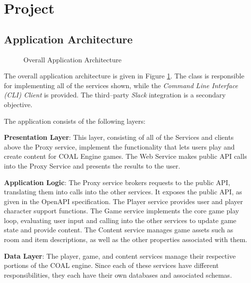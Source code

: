\documentclass{article}
\newcommand{\enterProblemHeader}[1]{
}
\newcommand{\exitProblemHeader}[1]{
\nobreak\extramarks{#1}{}\nobreak
}
\newcounter{homeworkProblemCounter} %
\newcommand{\homeworkProblemName}{}
\newenvironment{homeworkProblem}[1][Problem \arabic{homeworkProblemCounter}]{ %
\stepcounter{homeworkProblemCounter} %
\renewcommand{\homeworkProblemName}{#1} %
\section{\homeworkProblemName} %
\enterProblemHeader{\homeworkProblemName} %
}{
\exitProblemHeader{\homeworkProblemName} %
}
\newcommand{\homeworkSectionName}{}
\newenvironment{homeworkSection}[1]{ %
\renewcommand{\homeworkSectionName}{#1} %
\subsection{\homeworkSectionName} %
\enterProblemHeader{\homeworkProblemName\ [\homeworkSectionName]} %
}{
\enterProblemHeader{\homeworkProblemName} %
}
\begin{document}
\begin{homeworkProblem}[Project]
\begin{homeworkSection}{Application Architecture}
\begin{figure}
\caption{Overall Application Architecture}
\label{fig:arch}
\end{figure}

The overall application architecture is given in Figure \ref{fig:arch}. The class is responsible for implementing all of the services shown, while the \textit{Command Line Interface (CLI) Client} is provided. The third--party \textit{Slack} integration is a secondary objective.

The application consists of the following layers:

\begin{compactitem}
	\item \textbf{Presentation Layer}: This layer, consisting of all of the Services and clients above the Proxy service, implement the functionality that lets users play and create content for COAL Engine games. The Web Service makes public API calls into the Proxy Service and presents the results to the user.
	\item \textbf{Application Logic}: The Proxy service brokers requests to the public API, translating them into calls into the other services. It exposes the public API, as given in the OpenAPI specification. The Player service provides user and player character support functions. The Game service implements the core game play loop, evaluating user input and calling into the other services to update game state and provide content. The Content service manages game assets such as room and item descriptions, as well as the other properties associated with them.
	\item \textbf{Data Layer}: The player, game, and content services manage their respective portions of the COAL engine. Since each of these services have different responsibilities, they each have their own databases and associated schemas.
\end{compactitem}


\end{homeworkSection}
\end{homeworkProblem}
\end{document}
